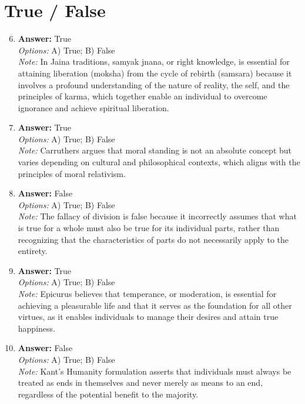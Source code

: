 \documentclass[12pt]{article}
\begin{document}
\section*{True / False}
\begin{enumerate}[label=\arabic*.]
\setcounter{enumi}{5}
\item \textbf{Answer:} True
\\ \textit{Options:} A) True; B) False
\\ \textit{Note:} In Jaina traditions, samyak jnana, or right knowledge, is essential for attaining liberation (moksha) from the cycle of rebirth (samsara) because it involves a profound understanding of the nature of reality, the self, and the principles of karma, which together enable an individual to overcome ignorance and achieve spiritual liberation.
\item \textbf{Answer:} True
\\ \textit{Options:} A) True; B) False
\\ \textit{Note:} Carruthers argues that moral standing is not an absolute concept but varies depending on cultural and philosophical contexts, which aligns with the principles of moral relativism.
\item \textbf{Answer:} False
\\ \textit{Options:} A) True; B) False
\\ \textit{Note:} The fallacy of division is false because it incorrectly assumes that what is true for a whole must also be true for its individual parts, rather than recognizing that the characteristics of parts do not necessarily apply to the entirety.
\item \textbf{Answer:} True
\\ \textit{Options:} A) True; B) False
\\ \textit{Note:} Epicurus believes that temperance, or moderation, is essential for achieving a pleasurable life and that it serves as the foundation for all other virtues, as it enables individuals to manage their desires and attain true happiness.
\item \textbf{Answer:} False
\\ \textit{Options:} A) True; B) False
\\ \textit{Note:} Kant's Humanity formulation asserts that individuals must always be treated as ends in themselves and never merely as means to an end, regardless of the potential benefit to the majority.
\end{enumerate}
\end{document}
